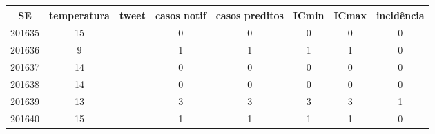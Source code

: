 \begin{tabular}{c|ccccccc}
  \hline
SE & temperatura & tweet & casos notif & casos preditos & ICmin & ICmax & incidência \\ 
  \hline
201635 & 15 &  & 0 & 0 & 0 & 0 & 0 \\ 
  201636 & 9 &  & 1 & 1 & 1 & 1 & 0 \\ 
  201637 & 14 &  & 0 & 0 & 0 & 0 & 0 \\ 
  201638 & 14 &  & 0 & 0 & 0 & 0 & 0 \\ 
  201639 & 13 &  & 3 & 3 & 3 & 3 & 1 \\ 
  201640 & 15 &  & 1 & 1 & 1 & 1 & 0 \\ 
   \hline
\end{tabular}

